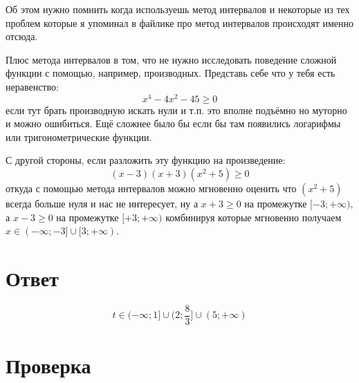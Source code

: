 \documentclass{article}
\begin{document}
Об этом нужно помнить когда используешь метод интервалов и некоторые из тех проблем которые я упоминал в файлике про метод интервалов происходят именно отсюда.

Плюс метода интервалов в том, что не нужно исследовать поведение сложной функции с помощью, например, производных. Представь себе что у тебя есть неравенство:
$$x^4-4x^2-45\ge{}0$$
если тут брать производную искать нули и т.п. это вполне подъёмно но муторно и можно ошибиться. Ещё сложнее было бы если бы там появились логарифмы или тригонометрические функции.

С другой стороны, если разложить эту функцию на произведение:
$$(x-3)(x+3)(x^2+5)\ge{}0$$
откуда с помощью метода интервалов можно мгновенно оценить что $(x^2+5)$ всегда больше нуля и нас не интересует, ну а $x+3\ge{}0$ на промежутке $[-3;+\infty)$, а $x-3\ge{}0$ на промежутке $[+3;+\infty)$ комбинируя которые мгновенно получаем $x\in{}(-\infty;-3]\cup{}[3;+\infty)$.

\section{Ответ}
$$t\in{}(-\infty;1]\cup{}(2;\frac{8}{3}]\cup{}(5;+\infty)$$

\section{Проверка}
\end{document}
